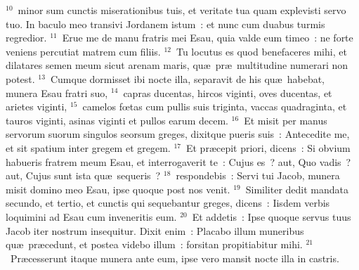 ${}^{10}$~minor sum cunctis miserationibus tuis, et veritate tua quam explevisti servo tuo. In baculo meo transivi Jordanem istum~: et nunc cum duabus turmis regredior.
${}^{11}$~Erue me de manu fratris mei Esau, quia valde eum timeo~: ne forte veniens percutiat matrem cum filiis.
${}^{12}$~Tu locutus es quod benefaceres mihi, et dilatares semen meum sicut arenam maris, qu\ae\ pr\ae\ multitudine numerari non potest.
${}^{13}$~Cumque dormisset ibi nocte illa, separavit de his qu\ae\ habebat, munera Esau fratri suo,
${}^{14}$~capras ducentas, hircos viginti, oves ducentas, et arietes viginti,
${}^{15}$~camelos fœtas cum pullis suis triginta, vaccas quadraginta, et tauros viginti, asinas viginti et pullos earum decem.
${}^{16}$~Et misit per manus servorum suorum singulos seorsum greges, dixitque pueris suis~: Antecedite me, et sit spatium inter gregem et gregem.
${}^{17}$~Et pr\ae cepit priori, dicens~: Si obvium habueris fratrem meum Esau, et interrogaverit te~: Cujus es~? aut, Quo vadis~? aut, Cujus sunt ista qu\ae\ sequeris~?
${}^{18}$~respondebis~: Servi tui Jacob, munera misit domino meo Esau, ipse quoque post nos venit.
${}^{19}$~Similiter dedit mandata secundo, et tertio, et cunctis qui sequebantur greges, dicens~: Iisdem verbis loquimini ad Esau cum inveneritis eum.
${}^{20}$~Et addetis~: Ipse quoque servus tuus Jacob iter nostrum insequitur. Dixit enim~: Placabo illum muneribus qu\ae\ pr\ae cedunt, et postea videbo illum~: forsitan propitiabitur mihi.
${}^{21}$~Pr\ae cesserunt itaque munera ante eum, ipse vero mansit nocte illa in castris.


